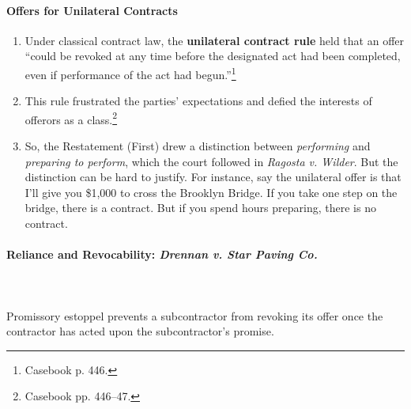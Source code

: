 \paragraph{Offers for Unilateral Contracts}

\begin{enumerate}
    \item Under classical contract law, the \textbf{unilateral contract rule} 
    held that an offer ``could be revoked at any time before the designated 
    act had been completed, even if performance of the act had 
    begun.''\footnote{Casebook p. 446.}
    \item This rule frustrated the parties' expectations and defied the 
    interests of offerors as a class.\footnote{Casebook pp. 446--47.}
    \item So, the Restatement (First) drew a distinction between 
    \emph{performing} and \emph{preparing to perform}, which the court 
    followed in \emph{Ragosta v. Wilder}. But the distinction can be hard to 
    justify. For instance, say the unilateral offer is that I'll give you 
    \$1,000 to cross the Brooklyn Bridge. If you take one step on the bridge, 
    there is a contract. But if you spend hours preparing, there is no 
    contract.
\end{enumerate}

\paragraph{Reliance and Revocability: \emph{Drennan v. Star Paving Co.}}
~\\\\
Promissory estoppel prevents a subcontractor from revoking its offer once the 
contractor has acted upon the subcontractor's promise.

